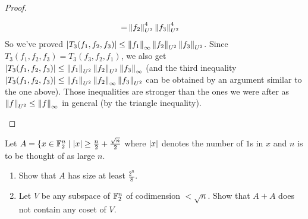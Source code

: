 \documentclass{article}
\begin{document}
\begin{proof}
\begin{enumerate}
\begin{align*}
      = & \left\lVert f_2\right\rVert_{U^2}^4 \left\lVert f_3\right\rVert_{U^2}^4
    \end{align*}
    So we've proved $\left\lvert T_3(f_1, f_2, f_3)\right\rvert \le \left\lVert f_1\right\rVert_\infty \left\lVert f_2\right\rVert_{U^2} \left\lVert f_3\right\rVert_{U^2}$. Since $T_3(f_1, f_2, f_3) = T_3(f_3, f_2, f_1)$, we also get $\left\lvert T_3(f_1, f_2, f_3)\right\rvert \le \left\lVert f_1\right\rVert_{U^2} \left\lVert f_2\right\rVert_{U^2} \left\lVert f_3\right\rVert_\infty$ (and the third inequality $\left\lvert T_3(f_1, f_2, f_3)\right\rvert \le \left\lVert f_1\right\rVert_{U^2} \left\lVert f_2\right\rVert_\infty \left\lVert f_3\right\rVert_{U^2}$ can be obtained by an argument similar to the one above). Those inequalities are stronger than the ones we were after as $\left\lVert f\right\rVert_{U^2} \le \left\lVert f\right\rVert_\infty$ in general (by the triangle inequality).
  \end{enumerate}
\end{proof}

\begin{problem}
  Let $A = \{x \in \mathbb F_2^n \mid \left\lvert x\right\rvert \ge \frac n2 + \frac{\sqrt n}2$ where $\left\lvert x\right\rvert$ denotes the number of $1$s in $x$ and $n$ is to be thought of as large $n$.
  \begin{enumerate}
    \item Show that $A$ has size at least $\frac{2^n}8$.
    \item Let $V$ be any subspace of $\mathbb F_2^n$ of codimension $< \sqrt n$. Show that $A + A$ does not contain any coset of $V$.
  \end{enumerate}
\end{problem}
\end{document}

